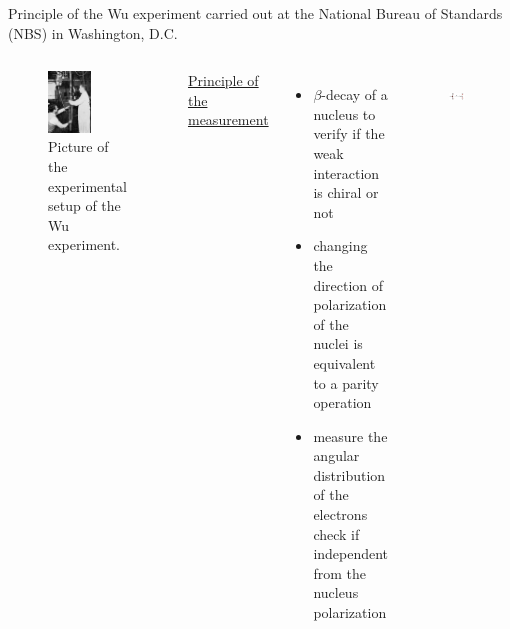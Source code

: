 \documentclass[aspectratio=1610, 10pt]{beamer}
\begin{document}
\begin{frame}{Principle of the Wu experiment}
	carried out at the National Bureau of Standards (NBS) in Washington, D.C.
	\begin{columns}[c]
		\begin{figure}
			\includegraphics[width=0.55\textwidth]{images/Wu_experiment_NBS.jpg}
			\caption{Picture of the experimental setup of the Wu experiment.\cite{WuExperiment}}
			\label{fig:Wu1}
		\end{figure}
		\underline{Principle of the measurement}\nocite{PhysRev.105.1413}
		\begin{itemize}
			\item $\beta$-decay of a nucleus to verify if the weak interaction is chiral or not
			\item changing the direction of polarization of the nuclei is equivalent to a parity operation
			\item measure the angular distribution of the electrons\\
			\textrightarrow check if independent from the nucleus polarization
		\end{itemize}
		\begin{figure}
			\includegraphics[width=0.7\textwidth]{images/parity_solinoid.png}
			\label{fig:Wu3}
		\end{figure}
	\end{columns}
\end{frame}
\end{document}
